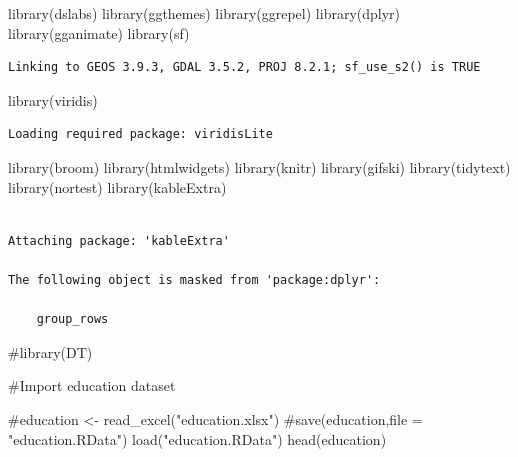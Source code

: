 \documentclass[
  11pt,
  a4paper,
  DIV=11,
  numbers=noendperiod]{scrartcl}
\newenvironment{Shaded}{\begin{snugshade}}{\end{snugshade}}
\newcommand{\CommentTok}[1]{\textcolor[rgb]{0.37,0.37,0.37}{#1}}
\newcommand{\FunctionTok}[1]{\textcolor[rgb]{0.28,0.35,0.67}{#1}}
\newcommand{\NormalTok}[1]{\textcolor[rgb]{0.00,0.23,0.31}{#1}}
\newcommand{\StringTok}[1]{\textcolor[rgb]{0.13,0.47,0.30}{#1}}
\begin{document}
\begin{Shaded}
\begin{Highlighting}[]
\FunctionTok{library}\NormalTok{(dslabs)}
\FunctionTok{library}\NormalTok{(ggthemes)}
\FunctionTok{library}\NormalTok{(ggrepel)}
\FunctionTok{library}\NormalTok{(dplyr)}
\FunctionTok{library}\NormalTok{(gganimate)}
\FunctionTok{library}\NormalTok{(sf)}
\end{Highlighting}
\end{Shaded}

\begin{verbatim}
Linking to GEOS 3.9.3, GDAL 3.5.2, PROJ 8.2.1; sf_use_s2() is TRUE
\end{verbatim}

\begin{Shaded}
\begin{Highlighting}[]
\FunctionTok{library}\NormalTok{(viridis)}
\end{Highlighting}
\end{Shaded}

\begin{verbatim}
Loading required package: viridisLite
\end{verbatim}

\begin{Shaded}
\begin{Highlighting}[]
\FunctionTok{library}\NormalTok{(broom)}
\FunctionTok{library}\NormalTok{(htmlwidgets)}
\FunctionTok{library}\NormalTok{(knitr)}
\FunctionTok{library}\NormalTok{(gifski)}
\FunctionTok{library}\NormalTok{(tidytext)}
\FunctionTok{library}\NormalTok{(nortest)}
\FunctionTok{library}\NormalTok{(kableExtra)}
\end{Highlighting}
\end{Shaded}

\begin{verbatim}

Attaching package: 'kableExtra'

The following object is masked from 'package:dplyr':

    group_rows
\end{verbatim}

\begin{Shaded}
\begin{Highlighting}[]
\CommentTok{\#library(DT)}

\CommentTok{\#Import education dataset}

\CommentTok{\#education \textless{}{-} read\_excel("education.xlsx")}
\CommentTok{\#save(education,file = "education.RData")}
\FunctionTok{load}\NormalTok{(}\StringTok{"education.RData"}\NormalTok{)}
\FunctionTok{head}\NormalTok{(education)}
\end{Highlighting}
\end{Shaded}
\end{document}
